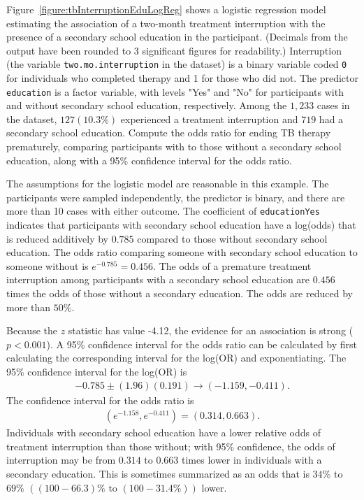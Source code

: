 \begin{examplewrap} 
  \begin{nexample}  {Figure~\ref{figure:tbInterruptionEduLogReg} shows a logistic regression model estimating the association of a two-month treatment interruption with the presence of a secondary school education in the participant. (Decimals from the output have been rounded to 3 significant figures for readability.) Interruption (the variable \texttt{two.mo.interruption} in the dataset) is a binary variable coded \texttt{0} for individuals who completed therapy and 1 for those who did not. The predictor \texttt{education} is a factor variable, with levels {"Yes"} and {"No"} for participants with and without secondary school education, respectively.  Among the $1,233$ cases in the dataset, $127 (10.3\%)$ experienced a treatment interruption and $719$ had a secondary school education. Compute the odds ratio for ending TB therapy prematurely, comparing participants with to those without a secondary school education, along with a 95\% confidence interval for the odds ratio.}

The assumptions for the logistic model are reasonable in this example. The participants were sampled independently, the predictor is binary, and there are more than 10 cases with either outcome.  The coefficient of \texttt{educationYes} indicates that participants with secondary school education have a log(odds) that is reduced additively by $0.785$ compared to those without secondary school education.  The odds ratio comparing someone with secondary school education to someone without is $e^{-0.785}=0.456.$  The odds of a premature treatment interruption among participants with a secondary school education are $0.456$ times the odds of those without a secondary education.  The odds are reduced by more than $50\%$.

Because the $z$ statistic has value -4.12, the evidence for an association is strong ($p < 0.001$).  A 95\% confidence interval for the odds ratio can be calculated by first calculating the corresponding interval for the log(OR) and exponentiating.  The 95\% confidence interval for the log(OR) is
\begin{align*}
  -0.785 \pm (1.96)(0.191) \longrightarrow (-1.159,-0.411).
\end{align*}
The confidence interval for the odds ratio is
\begin{align*}
  (e^{-1.158}, e^{-0.411}) = (0.314,0.663).
\end{align*}
    Individuals with secondary school education have a lower relative odds of treatment interruption than those without; with 95\% confidence, the odds of interruption may be from $0.314$ to $0.663$ times lower in individuals with a secondary education.  This is sometimes summarized as an odds that is $34\%$ to $69\%$ $((100 - 66.3)\% \text{ to } (100 - 31.4\%))$ lower.

\label{example:tbInterruptionEducation}
\end{nexample}
\end{examplewrap}

